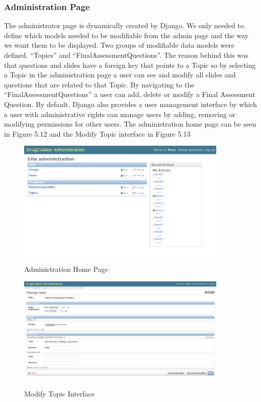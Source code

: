 \documentclass{l3proj}
\begin{document}
\subsubsection{Administration Page}
The administrator page is dynamically created by Django. We only needed to define which models needed to be modifiable from the admin page and the  way we want them to be displayed.  Two groups of modifiable data models were defined. “Topics” and “FinalAssessmentQuestions”. The reason behind this was that questions and slides have a foreign key that points to a Topic so by selecting a Topic in the administration page a user can see and modify all slides and questions that are related to that Topic. By navigating to the “FinalAssessmentQuestions” a user can add, delete or modify a Final Assessment Question. By default, Django also provides a user management interface by which  a user with administrative rights can manage users by adding, removing or modifying permissions for other users. The administration home page can be seen in Figure 5.12 and the Modify Topic interface in Figure 5.13
\begin{figure}[!htb]
\caption{Administration Home Page}
 \centering
\includegraphics[width=0.9\textwidth]{images/adminPage.png}
\end{figure}

\begin{figure}[!htb]
\caption{Modify Topic Interface}
 \centering
\includegraphics[width=0.9\textwidth]{images/adminTopic.png}
\end{figure}
\end{document}
